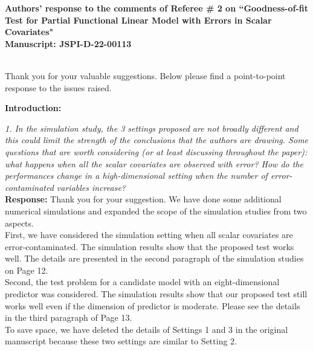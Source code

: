 \documentclass[12pt]{report}
\begin{document}
\begin{center}
{\bf\Large Authors' response to the comments of Referee \# 2 on ``Goodness-of-fit Test for Partial Functional Linear Model with Errors in Scalar Covariates" \\[6pt] \normalsize{Manuscript: %
JSPI-D-22-00113}}
\end{center}




\\

Thank you for your valuable suggestions. Below please find a point-to-point response to the issues raised. \\

\vspace*{0.1in}

{\bf Introduction:}

\begin{description}

\item {{ \textcolor[rgb]{0.00,0.50,1.00}{\em 1.  In the simulation study, the 3 settings proposed are not broadly different and this could limit the
strength of the conclusions that the authors are drawing. Some questions that are worth considering
(or at least discussing throughout the paper): what happens when all the scalar covariates are
observed with error? How do the performances change in a high-dimensional setting when the
number of error-contaminated variables increase? }}} \\

{ \bf Response: } Thank you for your  suggestion. We have done some additional numerical simulations and expanded the scope of the simulation studies from two aspects.  \\

First,  we have considered the simulation setting when all scalar covariates are error-contaminated. The simulation results show that the proposed test works well.  The details are presented in the second paragraph of the simulation studies on Page 12.  \\

Second, the test problem for a candidate model with an eight-dimensional predictor was considered. The simulation results show that our proposed
test still works well even if  the dimension of predictor is moderate. Please see the details in the third paragraph of Page 13. \\

To save space, we have deleted the details of Settings 1  and  3  in the original manuscript because these two settings are similar to Setting 2.  \\


\end{description}
\end{document}
